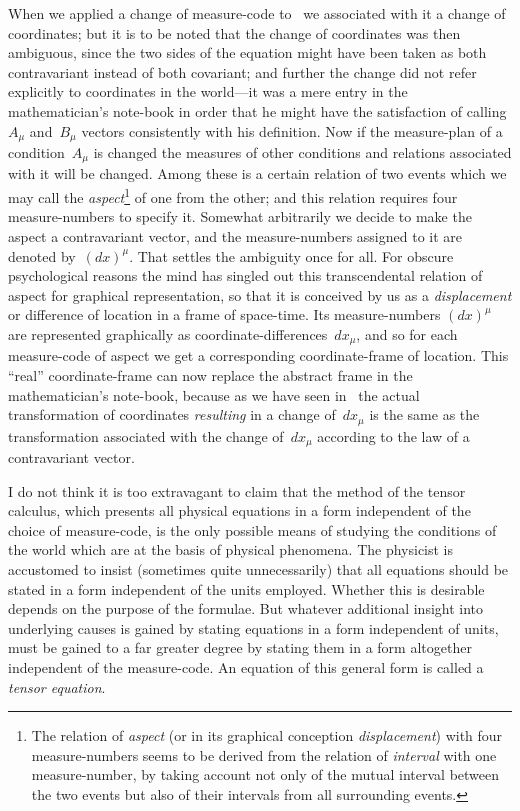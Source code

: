 \documentclass[12pt]{book}
\begin{document}
When we applied a change of measure-code to~ we associated with
it a change of coordinates; but it is to be noted that the change of coordinates
%
was then ambiguous, since the two sides of the equation might have been
taken as both contravariant instead of both covariant; and further the change
did not refer explicitly to coordinates in the world---it was a mere entry in
the mathematician's note-book in order that he might have the satisfaction
of calling $A_{\mu}$ and~$B_{\mu}$ vectors consistently with his definition. Now if the
measure-plan of a condition~$A_{\mu}$ is changed the measures of other conditions
and relations associated with it will be changed. Among these is a certain
relation of two events which we may call the \emph{aspect}\footnote
  {The relation of \emph{aspect} (or in its graphical conception \emph{displacement}) with four measure-numbers
%
%
  seems to be derived from the relation of \emph{interval} with one measure-number, by taking
  account not only of the mutual interval between the two events but also of their intervals from
  all surrounding events.}
of one from the other;
and this relation requires four measure-numbers to specify it. Somewhat
arbitrarily we decide to make the aspect a contravariant vector, and the
measure-numbers assigned to it are denoted by~$(dx)^{\mu}$. That settles the ambiguity
once for all. For obscure psychological reasons the mind has singled
out this transcendental relation of aspect for graphical representation, so that
it is conceived by us as a \emph{displacement} or difference of location in a frame of
space-time. Its measure-numbers $(dx)^{\mu}$ are represented graphically as coordinate-differences~$dx_{\mu}$,
and so for each measure-code of aspect we get a corresponding
coordinate-frame of location. This ``real'' coordinate-frame can now
replace the abstract frame in the mathematician's note-book, because as we
have seen in~ the actual transformation of coordinates \emph{resulting} in a
change of~$dx_{\mu}$ is the same as the transformation associated with the change of~$dx_{\mu}$
according to the law of a contravariant vector.

I do not think it is too extravagant to claim that the method of the tensor
%
calculus, which presents all physical equations in a form independent of the
choice of measure-code, is the only possible means of studying the conditions
of the world which are at the basis of physical phenomena. The physicist is
accustomed to insist (sometimes quite unnecessarily) that all equations should
be stated in a form independent of the units employed. Whether this is
desirable depends on the purpose of the formulae. But whatever additional
insight into underlying causes is gained by stating equations in a form independent
of units, must be gained to a far greater degree by stating them in
a form altogether independent of the measure-code. An equation of this
general form is called a \emph{tensor equation}.
\end{document}
